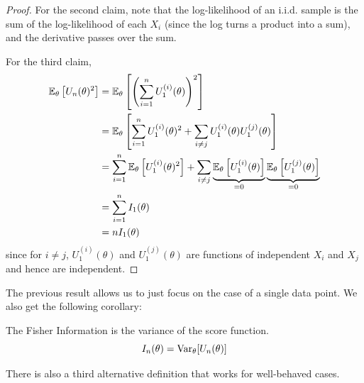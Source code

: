 \documentclass[../../../main.tex]{subfiles}
\begin{document}
\begin{proposition}
\begin{proof}
        For the second claim, note that the log-likelihood of an i.i.d. sample is the sum of the log-likelihood of each $X_i$ (since the log turns a product into a sum), and the derivative passes over the sum.

        For the third claim,
        \begin{align*}
            \mathbb{E}_\theta\left[U_n(\theta)^2\right]&=\mathbb{E}_\theta\left[\left(\sum_{i=1}^n U^{(i)}_1(\theta)\right)^2\right]\\
            &=\mathbb{E}_\theta\left[\sum_{i=1}^n U^{(i)}_1(\theta)^2 + \sum_{i\neq j}U^{(i)}_1(\theta)U^{(j)}_1(\theta)\right]\\
            &=\sum_{i=1}^n \mathbb{E}_\theta\left[U^{(i)}_1(\theta)^2\right]+\sum_{i\neq j}\underbrace{\mathbb{E}_\theta\left[U^{(i)}_1(\theta)\right]}_{=0}\underbrace{\mathbb{E}_\theta\left[U^{(j)}_1(\theta)\right]}_{=0}\\
            &=\sum_{i=1}^n I_1(\theta)\\
            &=nI_1(\theta)
        \end{align*}
        since for $i\neq j$, $U^{(i)}_1(\theta)$ and $U^{(j)}_1(\theta)$ are functions of independent $X_i$ and $X_j$ and hence are independent.
    \end{proof}
\end{proposition}
The previous result allows us to just focus on the case of a single data point. We also get the following corollary:
\begin{corollary} \label{cor:fi-variance-defn}
    The Fisher Information is the variance of the score function.
    \begin{equation*}
        I_n(\theta) = \operatorname{Var}_\theta[U_n(\theta)]
    \end{equation*}
\end{corollary}
There is also a third alternative definition that works for well-behaved cases.
\end{document}
